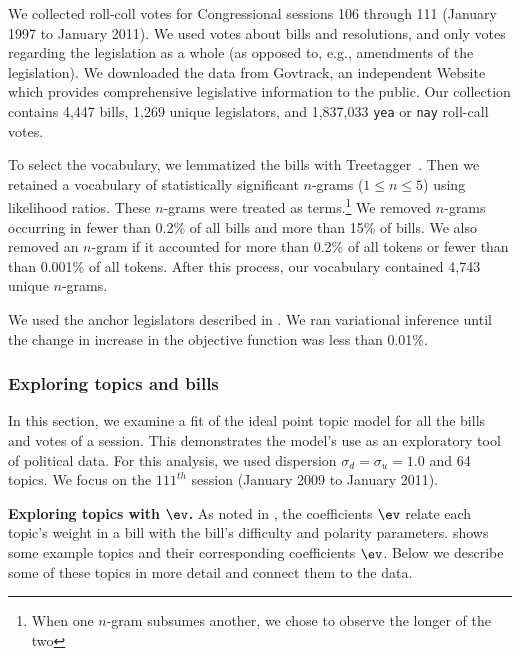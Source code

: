 We collected roll-coll votes for Congressional sessions 106 through
111 (January 1997 to January 2011).  We used votes about bills and
resolutions, and only votes regarding the legislation as a whole
(as opposed to, e.g., amendments of the legislation). We downloaded
the data from Govtrack, an independent Website which provides
comprehensive legislative information to the public.  Our
collection contains 4,447 bills, 1,269 unique legislators, and
1,837,033 \verb!yea! or \verb!nay! roll-call votes.

To select the vocabulary, we lemmatized the bills with
Treetagger~\citep{treetagger}.  Then we retained a vocabulary of
statistically significant $n$-grams ($1 \le n \le 5$) using likelihood
ratios.  These $n$-grams were treated as terms.\footnote{When one
  $n$-gram subsumes another, we chose to observe the longer of the
  two}  We removed $n$-grams occurring in fewer than 0.2\% of all
bills and more than 15\% of bills.  We also removed an
$n$-gram if it accounted for more than 0.2\% of all tokens or fewer
than than 0.001\% of all tokens.  After this process, our vocabulary
contained 4,743 unique $n$-grams.

We used the anchor legislators described in .  We ran
variational inference until the change in increase in the objective
function was less than 0.01\%.

\subsubsection*{Exploring topics and bills}

In this section, we examine a fit of the ideal point topic model for
all the bills and votes of a session.  This demonstrates the model's
use as an exploratory tool of political data.  For this analysis, we
used dispersion $\sigma_d = \sigma_u = 1.0$ and 64 topics.  We focus
on the $111^{th}$ session (January 2009 to January 2011).

\textbf{Exploring topics with $\ev$.} As noted in , the
coefficients $\ev$ relate each topic's weight in a bill with the
bill's difficulty and polarity parameters.  shows
some example topics and their corresponding coefficients $\ev$.  Below
we describe some of these topics in more detail and connect them to
the data.

